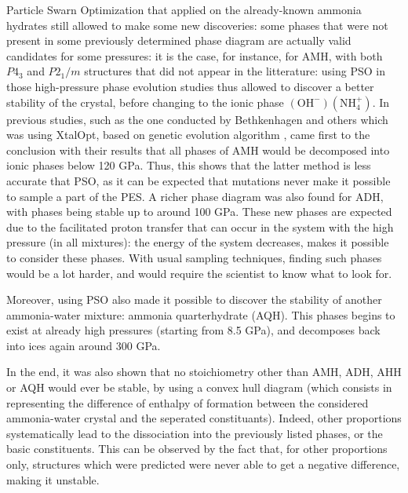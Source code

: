 \documentclass[11pt]{article}
\begin{document}
\begin{multicols}{2}
Particle Swarn Optimization that applied on the already-known ammonia hydrates still allowed to make some new discoveries: some phases that were not present in some previously determined phase diagram are actually valid candidates for some pressures: it is the case, for instance, for AMH, with both $P4_3$ and $P2_1/m$ structures that did not appear in the litterature: using PSO in those high-pressure phase evolution studies thus allowed to discover a better stability of the crystal, before changing to the ionic phase $(\mathrm{OH}^-)(\mathrm{NH}_4^+)$. In previous studies, such as the one conducted by Bethkenhagen and others which was using XtalOpt, based on genetic evolution algorithm \cite{doi:10.1021/acs.jpca.5b07854}, came first to the conclusion with their results that all phases of AMH would be decomposed into ionic phases below 120 GPa. Thus, this shows that the latter method is less accurate that PSO, as it can be expected that mutations never make it possible to sample a part of the PES. A richer phase diagram was also found for ADH, with phases being stable up to around 100 GPa. These new phases are expected due to the facilitated proton transfer that can occur in the system with the high pressure (in all mixtures): the energy of the system decreases, makes it possible to consider these phases. With usual sampling techniques, finding such phases would be a lot harder, and would require the scientist to know what to look for.\vspace{1em}

Moreover, using PSO also made it possible to discover the stability of another ammonia-water mixture: ammonia quarterhydrate (AQH). This phases begins to exist at already high pressures (starting from 8.5 GPa), and decomposes back into ices again around 300 GPa.\vspace{1em}

In the end, it was also shown that no stoichiometry other than AMH, ADH, AHH or AQH would ever be stable, by using a convex hull diagram (which consists in representing the difference of enthalpy of formation between the considered ammonia-water crystal and the seperated constituants). Indeed, other proportions systematically lead to the dissociation into the previously listed phases, or the basic constituents. This can be observed by the fact that, for other proportions only, structures which were predicted were never able to get a negative difference, making it unstable. 

\end{multicols}
\end{document}
